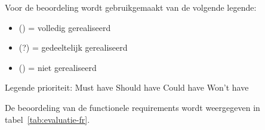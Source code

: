 \vspace{1em}

Voor de beoordeling wordt gebruikgemaakt van de volgende legende:

\begin{itemize}
    \item (\vink) = volledig gerealiseerd
    \item (?) = gedeeltelijk gerealiseerd
    \item (\kruisje) = niet gerealiseerd
\end{itemize}

\vspace{1em}

Legende prioriteit: \enspace \textcolor{red}{\textbf{\bol}} Must have 
\enspace \textcolor{orange}{\textbf{\bol}} Should have 
\enspace \textcolor{ForestGreen}{\textbf{\bol}} Could have 
\enspace \textcolor{gray}{\textbf{\bol}} Won't have

\vspace{1em}

De beoordeling van de functionele requirements wordt weergegeven in tabel~\ref{tab:evaluatie-fr}.

\vspace{1em}

